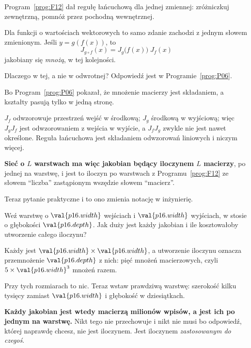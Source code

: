 \begin{fr}
Program~\ref{prog:F12} dał regułę łańcuchową dla jednej zmiennej: zróżniczkuj
zewnętrzną, pomnóż przez pochodną wewnętrznej.

Dla funkcji o wartościach wektorowych to samo zdanie zachodzi z jednym słowem
zmienionym. Jeśli $y = g(f(x))$, to
\[ J_{g \circ f}(x) = J_g\bigl(f(x)\bigr)\; J_f(x) \]
\dash{} jakobiany się \emph{mnożą}, w tej kolejności.

Dlaczego w tej, a nie w odwrotnej? Odpowiedź jest w
Programie~\ref{prog:P06}.
\dotline
\nextframe
\end{fr}

\begin{fr}
\begin{ansblock}
Bo Program~\ref{prog:P06} pokazał, że mnożenie macierzy jest składaniem, a
kształty pasują tylko w jedną stronę.
\end{ansblock}

$J_f$ odwzorowuje przestrzeń wejść w środkową; $J_g$ środkową w wyjściową; więc
$J_g J_f$ jest odwzorowaniem z wejścia w wyjście, a $J_f J_g$ zwykle nie jest
nawet określone. Reguła łańcuchowa jest składaniem odwzorowań liniowych i
niczym więcej.

\textbf{Sieć o $L$ warstwach ma więc jakobian będący iloczynem $L$ macierzy},
po jednej na warstwę, i jest to iloczyn po warstwach z
Programu~\ref{prog:F12} ze słowem \enquote{liczba} zastąpionym wszędzie słowem
\enquote{macierz}.
\end{fr}

\begin{fr}
Teraz pytanie praktyczne i to ono zmienia notację w inżynierię.

Weź warstwę o $\val{p16.width}$ wejściach i $\val{p16.width}$ wyjściach, w
stosie o głębokości $\val{p16.depth}$. Jak duży jest każdy jakobian i ile
kosztowałoby utworzenie całego iloczynu?
\dotline
\nextframe
\end{fr}

\begin{fr}
\begin{ansblock}
Każdy jest $\val{p16.width} \times \val{p16.width}$, a utworzenie iloczynu
oznacza przemnożenie $\val{p16.depth}$ z nich: pięć mnożeń macierzowych, czyli
$5 \times \val{p16.width}^{3}$ mnożeń razem.
\end{ansblock}

Przy tych rozmiarach to nic. Teraz wstaw prawdziwą warstwę: szerokość kilku
tysięcy zamiast $\val{p16.width}$ i głębokość w dziesiątkach.

\textbf{Każdy jakobian jest wtedy macierzą milionów wpisów, a jest ich po
jednym na warstwę.} Nikt tego nie przechowuje i nikt nie musi \dash{} bo
odpowiedź, której naprawdę chcesz, nie jest iloczynem. Jest iloczynem
\emph{zastosowanym do czegoś}.
\end{fr}

